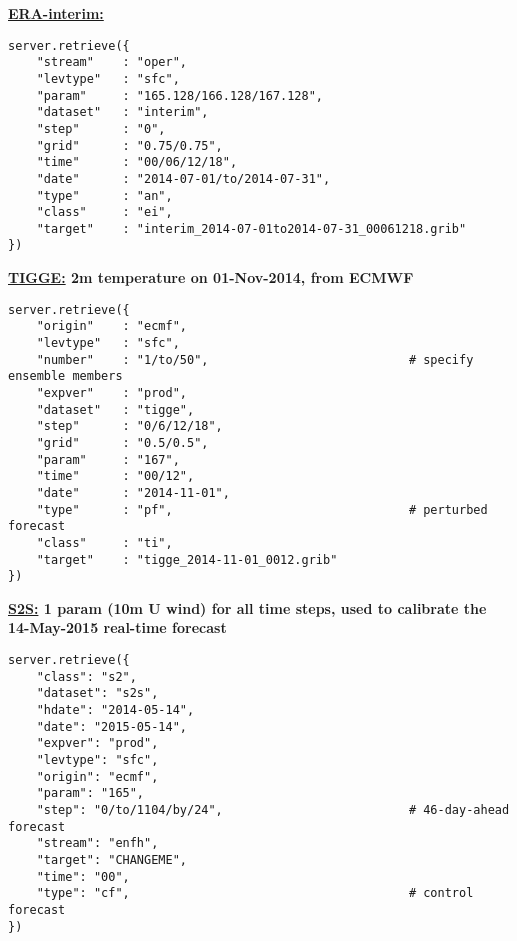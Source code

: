 \documentclass[10pt,fleqn]{article}
\begin{document}
\begin{framed}
\textbf{\href{https://software.ecmwf.int/wiki/display/WEBAPI/Python+ERA-interim+examples}{ERA-interim:} \footnotesize{}}
\begin{lstlisting}   
server.retrieve({
    "stream"    : "oper",
    "levtype"   : "sfc",
    "param"     : "165.128/166.128/167.128",
    "dataset"   : "interim",
    "step"      : "0",
    "grid"      : "0.75/0.75",
    "time"      : "00/06/12/18",
    "date"      : "2014-07-01/to/2014-07-31",
    "type"      : "an",
    "class"     : "ei",
    "target"    : "interim_2014-07-01to2014-07-31_00061218.grib"
})
\end{lstlisting}
\end{framed} %

\begin{framed}
\textbf{\href{https://software.ecmwf.int/wiki/display/WEBAPI/Python+TIGGE+examples}{TIGGE:} \footnotesize{2m temperature on 01-Nov-2014, from ECMWF}}
\begin{lstlisting}
server.retrieve({
    "origin"    : "ecmf",
    "levtype"   : "sfc",
    "number"    : "1/to/50",							# specify ensemble members
    "expver"    : "prod",
    "dataset"   : "tigge",
    "step"      : "0/6/12/18",
    "grid"      : "0.5/0.5",
    "param"     : "167",
    "time"      : "00/12",
    "date"      : "2014-11-01",
    "type"      : "pf",									# perturbed forecast
    "class"     : "ti",
    "target"    : "tigge_2014-11-01_0012.grib"
})
\end{lstlisting}
\end{framed} %


\begin{framed} %
\textbf{\href{https://software.ecmwf.int/wiki/display/WEBAPI/Python+S2S+examples}{S2S:} \footnotesize{1 param (10m U wind) for all time steps, used to calibrate the 14-May-2015 real-time forecast}}
\begin{lstlisting}
server.retrieve({
    "class": "s2",
    "dataset": "s2s",
    "hdate": "2014-05-14",
    "date": "2015-05-14",
    "expver": "prod",
    "levtype": "sfc",
    "origin": "ecmf",
    "param": "165",
    "step": "0/to/1104/by/24",							# 46-day-ahead forecast
    "stream": "enfh",
    "target": "CHANGEME",
    "time": "00",
    "type": "cf",										# control forecast
})
\end{lstlisting}
\end{framed}
\end{document}
